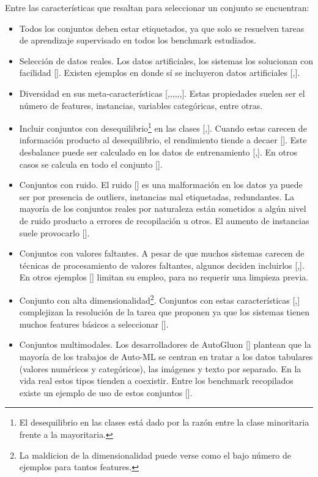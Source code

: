 Entre las características que  resaltan para seleccionar un conjunto se encuentran:
\begin{itemize}
    \item Todos los conjuntos deben estar etiquetados, ya que solo se resuelven tareas de aprendizaje supervisado en todos los benchmark estudiados.
    \item Selección de datos reales. Los datos artificiales, los sistemas los solucionan con facilidad [\cite{15}]. Existen ejemplos en donde sí 
    se incluyeron datos artificiales [\cite{10},\cite{16}]. 
    \item Diversidad en sus meta-características [\cite{10},\cite{15},\cite{16},\cite{17},\cite{18},\cite{22},\cite{28}]. Estas propiedades suelen ser
    el número de features, instancias, variables categóricas, entre otras.
    \item Incluir conjuntos con desequilibrio\footnote{El desequilibrio en las clases está dado por la razón entre la clase minoritaria frente a la mayoritaria.} en 
    las clases [\cite{16},\cite{31}]. Cuando estas carecen de información producto al desequilibrio, el rendimiento tiende a decaer [\cite{16}]. Este desbalance puede 
    ser calculado en los datos de entrenamiento [\cite{11},\cite{29}]. En otros casos se calcula en todo el conjunto [\cite{31}]. 
    \item Conjuntos con ruido. El ruido [\cite{47}] es una malformación en los datos ya puede ser por presencia de outliers, instancias mal etiquetadas, 
    redundantes. La mayoría de los conjuntos reales por naturaleza están sometidos a algún nivel de ruido producto a errores de recopilación u otros. 
    El aumento de instancias suele provocarlo [\cite{24}]. 
    \item Conjuntos con valores faltantes. A pesar de que muchos sistemas carecen de técnicas de procesamiento de valores faltantes, algunos deciden incluirlos 
    [\cite{10},\cite{11}]. En otros ejemplos [\cite{18}] limitan su empleo, para no requerir una limpieza previa.
    \item Conjunto con alta dimensionalidad\footnote{La maldicion de la dimensionalidad puede verse como el bajo número de ejemplos para tantos features.}. 
    Conjuntos con estas características [\cite{11},\cite{24}] complejizan la resolución de la tarea que proponen ya que los sistemas tienen muchos features básicos 
    a seleccionar [\cite{47}].
    \item Conjuntos multimodales. Los desarrolladores de AutoGluon [\cite{42}] plantean que la mayoría de los trabajos de Auto-ML se centran en tratar a los datos 
    tabulares (valores numéricos y categóricos), las imágenes y texto por separado. En la vida real estos tipos tienden a coexistir. Entre los benchmark recopilados 
    existe un ejemplo de uso de estos conjuntos [\cite{27}]. 
   
    \end{itemize} 
